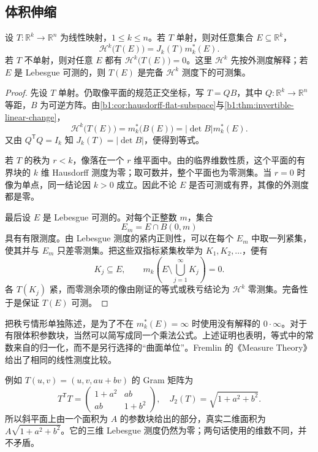 \subsection{体积伸缩}
\label{b1:subsec:170103}

\begin{theorem}[线性面积公式]\label{b1:thm:linear-area-formula}
设 \(T:\mathbb R^k\to\mathbb R^n\) 为线性映射，\(1\leq k\leq n\)。若 \(T\) 单射，则对任意集合 \(E\subseteq\mathbb R^k\)，
\[
 \mathcal H^k\bigl(T(E)\bigr)=J_k(T)m_k^*(E).
\]
若 \(T\) 不单射，则对任意 \(E\) 都有 \(\mathcal H^k\bigl(T(E)\bigr)=0\)。这里 \(\mathcal H^k\) 先按外测度解释；若 \(E\) 是 Lebesgue 可测的，则 \(T(E)\) 是完备 \(\mathcal H^k\) 测度下的可测集。
\end{theorem}
\begin{proof}
先设 \(T\) 单射。仍取像平面的规范正交坐标，写 \(T=QB\)，其中 \(Q:\mathbb R^k\to\mathbb R^n\) 等距，\(B\) 为可逆方阵。由\cref{b1:cor:hausdorff-flat-subspace}与\cref{b1:thm:invertible-linear-change}，
\[
 \mathcal H^k\bigl(T(E)\bigr)
 =m_k^*\bigl(B(E)\bigr)
 =|\det B|m_k^*(E).
\]
又由 \(Q^{\mathsf T}Q=I_k\) 知 \(J_k(T)=|\det B|\)，便得到等式。

若 \(T\) 的秩为 \(r<k\)，像落在一个 \(r\) 维平面中。由的临界维数性质，这个平面的有界块的 \(k\) 维 Hausdorff 测度为零；取可数并，整个平面也为零测集。当 \(r=0\) 时像为单点，同一结论因 \(k>0\) 成立。因此不论 \(E\) 是否可测或有界，其像的外测度都是零。

最后设 \(E\) 是 Lebesgue 可测的。对每个正整数 \(m\)，集合
\[
 E_m=E\cap B(0,m)
\]
具有有限测度。由 Lebesgue 测度的紧内正则性，可以在每个 \(E_m\) 中取一列紧集，使其并与 \(E_m\) 只差零测集。把这些双指标紧集枚举为 \(K_1,K_2,\ldots\)，便有
\[
 K_j\subseteq E,
 \qquad
 m_k\!\left(E\setminus\bigcup_{j=1}^{\infty}K_j\right)=0.
\]
各 \(T(K_j)\) 紧，而零测余项的像由刚证的等式或秩亏结论为 \(\mathcal H^k\) 零测集。完备性于是保证 \(T(E)\) 可测。
\end{proof}

把秩亏情形单独陈述，是为了不在 \(m_k^*(E)=\infty\) 时使用没有解释的 \(0\cdot\infty\)。对于有限体积参数块，当然可以简写成同一个乘法公式。上述证明也表明，等式中的常数来自的归一化，而不是另行选择的“曲面单位”。Fremlin 的《Measure Theory》\cite[265B--C]{Fremlin2016Measure}给出了相同的线性测度比较。

\ProseParagraphBreak

例如 \(T(u,v)=(u,v,au+bv)\) 的 Gram 矩阵为
\[
 T^{\mathsf T}T=
 \begin{pmatrix}1+a^2&ab\\ab&1+b^2\end{pmatrix},
 \quad J_2(T)=\sqrt{1+a^2+b^2}.
\]
所以斜平面上由一个面积为 \(A\) 的参数块给出的部分，真实二维面积为 \(A\sqrt{1+a^2+b^2}\)。它的三维 Lebesgue 测度仍然为零；两句话使用的维数不同，并不矛盾。

